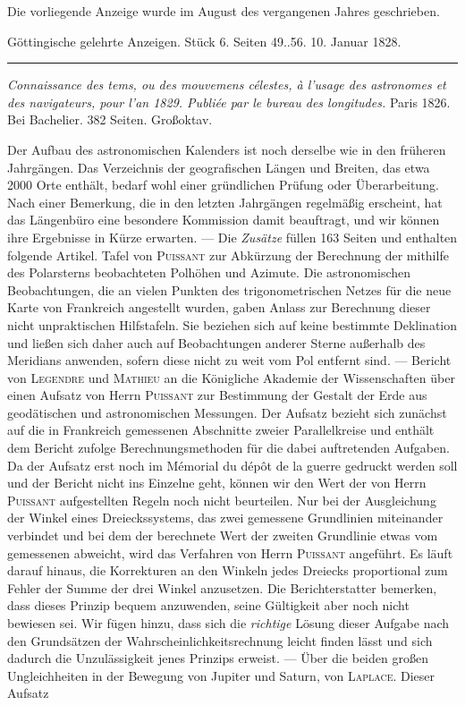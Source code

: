 \clearpage
{}
\hypertarget{native-650-lower}{}
\expandafter\def\csname HistoricalNoteText37\endcsname{Die vorliegende Anzeige wurde im August des vergangenen Jahres geschrieben.}
\begin{center}\small Göttingische gelehrte Anzeigen. Stück 6. Seiten 49..56. 10. Januar 1828.\\[3pt]\rule{.72\linewidth}{.3pt}\end{center}

\emph{Connaissance des tems, ou des mouvemens célestes, à l'usage des astronomes et des navigateurs, pour l'an \textup{1829}. Publiée par le bureau des longitudes.} Paris 1826. Bei Bachelier. 382 Seiten. Großoktav.

\begingroup\baselineskip=13pt\relax
Der Aufbau des astronomischen Kalenders ist noch derselbe wie in den früheren Jahrgängen. Das Verzeichnis der geografischen Längen und Breiten, das etwa 2000 Orte enthält, bedarf wohl einer gründlichen Prüfung oder Überarbeitung. Nach einer Bemerkung, die in den letzten Jahrgängen regelmäßig erscheint, hat das Längenbüro eine besondere Kommission damit beauftragt, und wir können ihre Ergebnisse in Kürze erwarten. --- Die \emph{Zusätze} füllen 163 Seiten und enthalten folgende Artikel. Tafel von \textsc{Puissant} zur Abkürzung der Berechnung der mithilfe des Polarsterns beobachteten Polhöhen und Azimute. Die astronomischen Beobachtungen, die an vielen Punkten des trigonometrischen Netzes für die neue Karte von Frankreich angestellt wurden, gaben Anlass zur Berechnung dieser nicht unpraktischen Hilfstafeln. Sie beziehen sich auf keine bestimmte Deklination und ließen sich daher auch auf Beobachtungen anderer Sterne außerhalb des Meridians anwenden, sofern diese nicht zu weit vom Pol entfernt sind. --- Bericht von \textsc{Legendre} und \textsc{Mathieu} an die Königliche Akademie der Wissenschaften über einen Aufsatz von Herrn \textsc{Puissant} zur Bestimmung der Gestalt der Erde aus geodätischen und astronomischen Messungen. Der Aufsatz bezieht sich zunächst auf die in Frankreich gemessenen Abschnitte zweier Parallelkreise und enthält dem Bericht  zufolge Berechnungsmethoden für die dabei auftretenden Aufgaben. Da der Aufsatz erst noch im Mémorial du dépôt de la guerre gedruckt werden soll und der Bericht nicht ins Einzelne geht, können wir den Wert der von Herrn \textsc{Puissant} aufgestellten Regeln noch nicht beurteilen. Nur bei der Ausgleichung der Winkel eines Dreieckssystems, das zwei gemessene Grundlinien miteinander verbindet und bei dem der berechnete Wert der zweiten Grundlinie etwas vom gemessenen abweicht, wird das Verfahren von Herrn \textsc{Puissant} angeführt. Es läuft darauf hinaus, die Korrekturen an den Winkeln jedes Dreiecks proportional zum Fehler der Summe der drei Winkel anzusetzen. Die Berichterstatter bemerken, dass dieses Prinzip bequem anzuwenden, seine Gültigkeit aber noch nicht bewiesen sei. Wir fügen hinzu, dass sich die \emph{richtige} Lösung dieser Aufgabe nach den Grundsätzen der Wahrscheinlichkeitsrechnung leicht finden lässt und sich dadurch die Unzulässigkeit jenes Prinzips erweist. --- Über die beiden großen Ungleichheiten in der Bewegung von Jupiter und Saturn, von \textsc{Laplace}. Dieser Aufsatz 